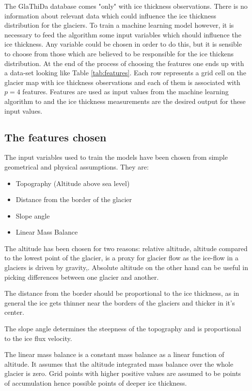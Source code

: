 The GlaThiDa database comes "only" with ice thickness observations. There is no information about relevant data which could influence the ice thickness distribution for the glaciers. To train a machine learning model however, it is necessary to feed the algorithm some input variables which should influence the ice thickness. Any variable could be chosen in order to do this, but it is sensible to choose from those which are believed to be responsible for the ice thickens distribution. At the end of the process of choosing the features one ends up with a data-set looking like Table \ref{tab:features}. Each row represents a grid cell on the glacier map with ice thickness observations and each of them is associated with $p = 4$ features. Features are used as input values from the machine learning algorithm to and the ice thickness measurements are the desired output for these input values. 


\subsection{The features chosen}\label{features-chosen}
The input variables used to train the models have been chosen from simple geometrical and physical assumptions. They are:

\begin{itemize}
	\item Topography (Altitude above sea level)
	\item Distance from the border of the glacier
	\item Slope angle
	\item Linear Mass Balance
\end{itemize}
The altitude has been chosen for two reasons: relative altitude, altitude compared to the lowest point of the glacier, is a proxy for glacier flow as the ice-flow in a glaciers is driven by gravity,. Absolute altitude on the other hand can be useful in picking differences between one glacier and another.

The distance from the border should be proportional to the ice thickness, as in general the ice gets thinner near the borders of the glaciers and thicker in it's center. 

The slope angle determines the steepness of the topography and is proportional to the ice flux velocity.

The linear mass balance is a constant mass balance as a linear function of altitude. It assumes that the altitude integrated mass balance over the whole glacier is zero. Grid points with higher positive values are assumed to be points of accumulation hence possible points of deeper ice thickness.
  
